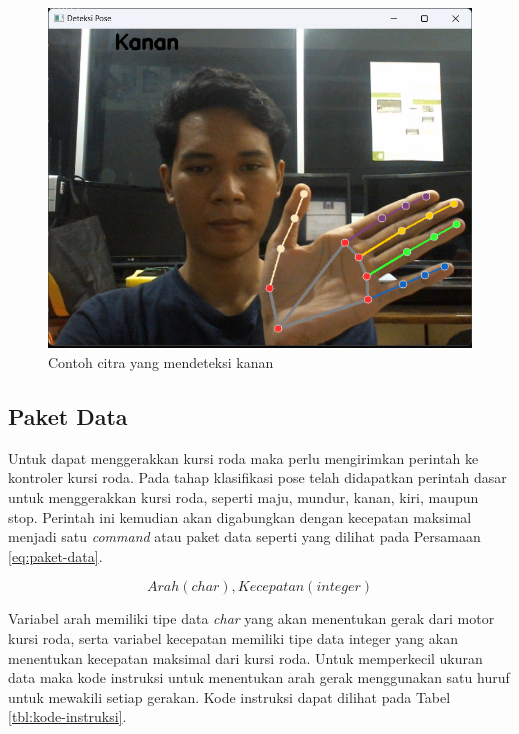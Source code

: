 \begin{figure} [h] \centering
  \includegraphics[scale=0.5]{gambar/bab3/Kanan}
  \caption{Contoh citra yang mendeteksi kanan}
  \label{fig:klasifikasi kanan}
\end{figure}

\newpage

\subsection{Paket Data}
Untuk dapat menggerakkan kursi roda maka perlu mengirimkan perintah ke kontroler kursi roda. Pada tahap klasifikasi pose telah didapatkan perintah dasar untuk menggerakkan kursi roda, seperti maju, mundur, kanan, kiri, maupun stop. Perintah ini kemudian akan digabungkan dengan kecepatan maksimal menjadi satu \emph{command} atau paket data seperti yang dilihat pada Persamaan \ref{eq:paket-data}.

\begin{equation}
  \label{eq:paket-data}
    Arah(char),Kecepatan(integer)
\end{equation}

Variabel arah memiliki tipe data \emph{char} yang akan menentukan gerak dari motor kursi roda, serta variabel kecepatan memiliki tipe data integer yang akan menentukan kecepatan maksimal dari kursi roda. Untuk memperkecil ukuran data maka kode instruksi untuk menentukan arah gerak menggunakan satu huruf untuk mewakili setiap gerakan. Kode instruksi dapat dilihat pada Tabel \ref{tbl:kode-instruksi}. 

